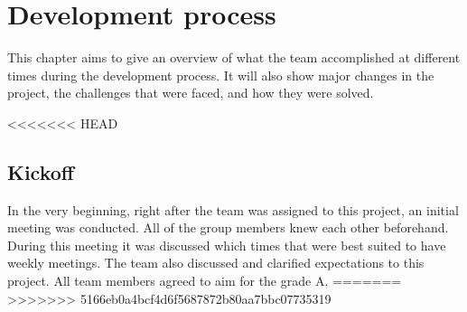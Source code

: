 \chapter{Development process}
\label{sec:sprintOverview}
This chapter aims to give an overview of what the team accomplished at different times during the development process. It will also show major changes in the project, the challenges that were faced, and how they were solved.

<<<<<<< HEAD
\section{Kickoff}
In the very beginning, right after the team was assigned to this project, an initial meeting was conducted. All of the group members knew each other beforehand. During this meeting it was discussed which times that were best suited to have weekly meetings. The team also discussed and clarified expectations to this project. All team members agreed to aim for the grade A.
=======
>>>>>>> 5166eb0a4bcf4d6f5687872b80aa7bbc07735319






